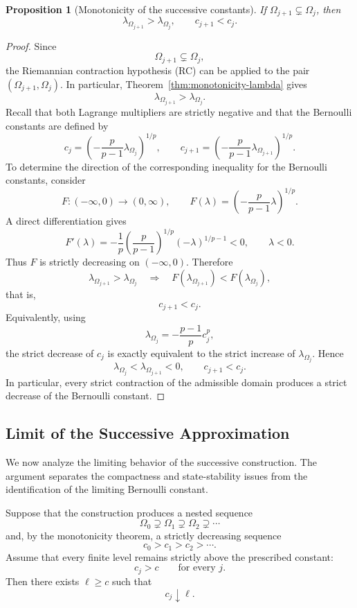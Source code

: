 \documentclass[11pt,a4paper]{article}
\newtheorem{proposition}[theorem]{Proposition}
\theoremstyle{definition}
\theoremstyle{remark}
\begin{document}
\begin{proposition}[Monotonicity of the successive constants]
\label{prop:successive-c-monotonicity}
If $\Omega_{j+1}\subsetneq\Omega_j$, then
\[
\lambda_{\Omega_{j+1}}>\lambda_{\Omega_j},\qquad c_{j+1}<c_j.
\]
\end{proposition}

\begin{proof}
Since
\[
\Omega_{j+1}\subsetneq\Omega_j,
\]
the Riemannian contraction hypothesis {\rm (RC)} can be applied to the
pair $(\Omega_{j+1},\Omega_j)$. In particular, Theorem~\ref{thm:monotonicity-lambda}
gives
\[
\lambda_{\Omega_{j+1}}>\lambda_{\Omega_j}.
\]
Recall that both Lagrange multipliers are strictly negative and that the
Bernoulli constants are defined by
\[
c_j
=
\left(
-\frac{p}{p-1}\lambda_{\Omega_j}
\right)^{1/p},
\qquad
c_{j+1}
=
\left(
-\frac{p}{p-1}\lambda_{\Omega_{j+1}}
\right)^{1/p}.
\]
To determine the direction of the corresponding inequality for the
Bernoulli constants, consider
\[
F:(-\infty,0)\longrightarrow(0,\infty),
\qquad
F(\lambda)
=
\left(
-\frac{p}{p-1}\lambda
\right)^{1/p}.
\]
A direct differentiation gives
\[
F'(\lambda)
=
-\frac1{p}
\left(\frac{p}{p-1}\right)^{1/p}
(-\lambda)^{1/p-1}<0,
\qquad \lambda<0.
\]
Thus $F$ is strictly decreasing on $(-\infty,0)$. Therefore
\[
\lambda_{\Omega_{j+1}}>\lambda_{\Omega_j}
\quad\Longrightarrow\quad
F(\lambda_{\Omega_{j+1}})
<
F(\lambda_{\Omega_j}),
\]
that is,
\[
c_{j+1}<c_j.
\]
Equivalently, using
\[
\lambda_{\Omega_j}
=
-\frac{p-1}{p}c_j^p,
\]
the strict decrease of $c_j$ is exactly equivalent to the strict increase
of $\lambda_{\Omega_j}$. Hence
\[
\lambda_{\Omega_j}<\lambda_{\Omega_{j+1}}<0,
\qquad
c_{j+1}<c_j.
\]
In particular, every strict contraction of the admissible domain produces
a strict decrease of the Bernoulli constant.
\end{proof}


\subsection{Limit of the Successive Approximation}
\label{sec:limit-successive-approximation}

We now analyze the limiting behavior of the successive construction.
The argument separates the compactness and state-stability issues from
the identification of the limiting Bernoulli constant.

Suppose that the construction produces a nested sequence
\[
\Omega_0\supsetneq\Omega_1\supsetneq\Omega_2\supsetneq\cdots
\]
and, by the monotonicity theorem, a strictly decreasing sequence
\[
c_0>c_1>c_2>\cdots.
\]
Assume that every finite level remains strictly above the prescribed
constant:
\begin{equation}
c_j>c
\qquad\text{for every }j.
\label{eq:successive-c-bounded}
\end{equation}
Then there exists $\ell\ge c$ such that
\begin{equation}
c_j\downarrow\ell.
\label{eq:c-limit}
\end{equation}
\end{document}
